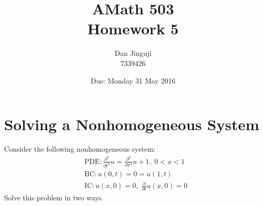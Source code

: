 \documentclass[12pt]{article}
\begin{document}
\title{AMath 503 \\ Homework 5}
\author{Dan Jinguji \\ 7339426}
\date{Due: Monday 31 May 2016}

\maketitle

\renewcommand\thesection {\arabic{section}.}
\renewcommand\thesubsection {(\alph{subsection})}
\renewcommand\thesubsubsection{\alph{subsubsection}.}
\newcommand{\pderiv}[1]{\ensuremath{\frac{\partial}{\partial #1}}}
\newcommand{\deriv}[1]{\ensuremath{\frac{d}{d #1}}}
\newcommand{\psec}[1]{\ensuremath{\frac{\partial^2}{\partial #1^2}}}
\newcommand{\pr}{\ensuremath{^{\prime}}}
\newcommand{\dpr}{\ensuremath{^{\prime\prime}}}
\newcommand{\llb}{\ensuremath{\left [}}
\newcommand{\rrb}{\ensuremath{\right ]}}
\newcommand{\llp}{\ensuremath{\left (}}
\newcommand{\rrp}{\ensuremath{\right )}}
\newcommand{\llg}{\ensuremath{\left \{}}
\newcommand{\rrg}{\ensuremath{\right .}}
\newcommand{\abs}[1]{\ensuremath{\lvert #1 \rvert}}
\newcommand{\eval}[3]{\ensuremath{\left. #1 \right\rvert_{#2}^{#3}}}
\newcommand{\at}{\ensuremath{\,\mathrm{at}\,}}
\newcommand{\goto}{\ensuremath{\rightarrow}}
\newcommand{\mathword}[1]{\ensuremath{\; \mathrm{#1} \;}}
\newcommand{\ueq}{\ensuremath{u_\mathrm{eq}}}
\newcommand{\utr}{\ensuremath{u_\mathrm{trans}}}

\section{Solving a Nonhomogeneous System}

Consider the following nonhomogeneous system:
\begin{align*}
&\mathrm{PDE}: \psec{t}u = \psec{x}u + 1,\;0 < x < 1 \\
&\mathrm{BC}: u(0,t) = 0 = u(1,t) \\
&\mathrm{IC}: u(x,0) = 0, \;\pderiv{t}u(x,0) = 0
\end{align*}
Solve this problem in two ways.
\end{document}
